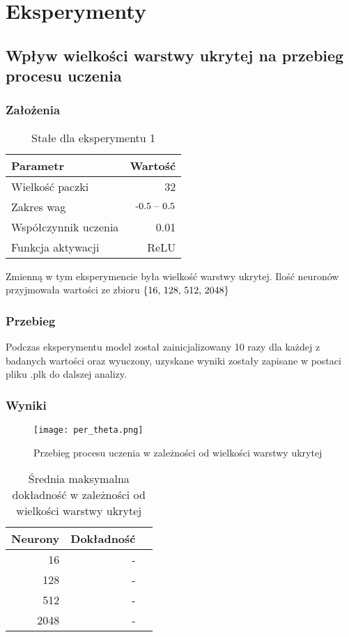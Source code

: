 \documentclass{article}
\begin{document}
\newpage
\section{Eksperymenty}

\subsection{Wpływ wielkości warstwy ukrytej na przebieg procesu uczenia}
\subsubsection*{Założenia}
\begin{table}[!h]
	\caption{Stałe dla eksperymentu 1}
	\label{tabela-const-1}
	\centering
	\begin{tabular}{lr}
		\toprule
		Parametr               & Wartość         \\
		\midrule
		Wielkość paczki      & 32                \\
		Zakres wag             & \($-0.5 -- 0.5$\) \\
		Współczynnik uczenia & 0.01              \\
		Funkcja aktywacji      & ReLU              \\
		\bottomrule
	\end{tabular}
\end{table}

Zmienną w tym eksperymencie była wielkość warstwy ukrytej. Ilość neuronów przyjmowała wartości ze zbioru \(\{$16, 128, 512, 2048$\}\)
\subsubsection*{Przebieg}

Podczas eksperymentu model został zainicjalizowany 10 razy dla każdej z badanych wartości oraz wyuczony, uzyskane wyniki zostały zapisane w postaci pliku .plk do dalszej analizy.

\subsubsection*{Wyniki}
\begin{figure}[!h]
	\centering
	\caption{Przebieg procesu uczenia w zależności od wielkości warstwy ukrytej}
	\texttt{[image: per\_theta.png]}
	\label{fig:res11}
\end{figure}

\begin{table}[!h]
	\caption{Średnia maksymalna dokładność w zależności od wielkości warstwy ukrytej}
	\label{tabela-res-11}
	\centering
	\begin{tabular}{rrr}
		\toprule
		Neurony & Dokładność \\
		\midrule
		16      & -             \\
		128     & -             \\
		512     & -             \\
		2048    & -             \\
		\bottomrule
	\end{tabular}
\end{table}
\end{document}
